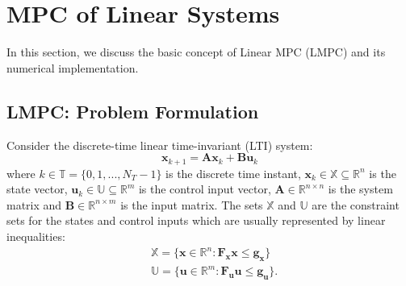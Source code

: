 \documentclass{article}
\begin{document}
 \section{MPC of Linear Systems}
 In this section, we discuss the basic concept of Linear MPC (LMPC) and its numerical implementation.
\subsection{LMPC: Problem Formulation}
Consider the discrete-time linear time-invariant (LTI) system:
\begin{equation}
{ \textbf{x}_{{k+1}}}=\textbf{A}\textbf{x}_{k}+\textbf{B}\textbf{u}_{k}
\end{equation}
where $k\in \mathbb{T}=\{0,1,...,N_{T}-1\}$ is the discrete time instant,
$\textbf{x}_{k}\in \mathbb{X} \subseteq \mathbb{R}^{n}$ is the state vector,  $\textbf{u}_{k}\in \mathbb{U} \subseteq \mathbb{R}^{m}$ is the control input vector, $\textbf{A} \in \mathbb{R}^{n \times n}$ is the system matrix and
$\textbf{B} \in \mathbb{R}^{n \times m}$ is the input matrix. The sets $\mathbb{X}$ and $\mathbb{U}$ are the constraint sets for the states and control inputs which are usually represented by linear inequalities:
\begin{equation}
\begin{aligned}
  & \mathbb{X}=\{\textbf{x} \in \mathbb{R}^{n}:  \textbf{F}_{\textbf{x}}\textbf{x} \leq \textbf{g}_{\textbf{x}} \}\\
  &\mathbb{U}=\{\textbf{u} \in \mathbb{R}^{m}:  \textbf{F}_{\textbf{u}}\textbf{u} \leq \textbf{g}_{\textbf{u}} \}.
  \end{aligned}
\end{equation}
\end{document}
